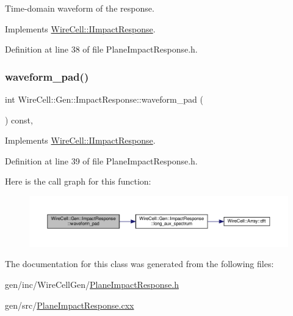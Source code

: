 Time-\/domain waveform of the response. 



Implements \hyperlink{class_wire_cell_1_1_i_impact_response_a3f4821a846e98daf92768e33e795df8d}{Wire\+Cell\+::\+I\+Impact\+Response}.



Definition at line 38 of file Plane\+Impact\+Response.\+h.

\mbox{\label{class_wire_cell_1_1_gen_1_1_impact_response_a11a5437cb671e68e35244757d92dda56}} 
\subsubsection{\texorpdfstring{waveform\+\_\+pad()}{waveform\_pad()}}
{\footnotesize\ttfamily int Wire\+Cell\+::\+Gen\+::\+Impact\+Response\+::waveform\+\_\+pad (\begin{DoxyParamCaption}{ }\end{DoxyParamCaption}) const\hspace{0.3cm}{\ttfamily [inline]}, {\ttfamily [virtual]}}



Implements \hyperlink{class_wire_cell_1_1_i_impact_response_ae706c2b62577ed856bfdb6d9453b9d98}{Wire\+Cell\+::\+I\+Impact\+Response}.



Definition at line 39 of file Plane\+Impact\+Response.\+h.

Here is the call graph for this function\+:
\nopagebreak
\begin{figure}[H]
\begin{center}
\leavevmode
\includegraphics[width=350pt]{class_wire_cell_1_1_gen_1_1_impact_response_a11a5437cb671e68e35244757d92dda56_cgraph}
\end{center}
\end{figure}


The documentation for this class was generated from the following files\+:\begin{DoxyCompactItemize}
\item 
gen/inc/\+Wire\+Cell\+Gen/\hyperlink{_plane_impact_response_8h}{Plane\+Impact\+Response.\+h}\item 
gen/src/\hyperlink{_plane_impact_response_8cxx}{Plane\+Impact\+Response.\+cxx}\end{DoxyCompactItemize}
